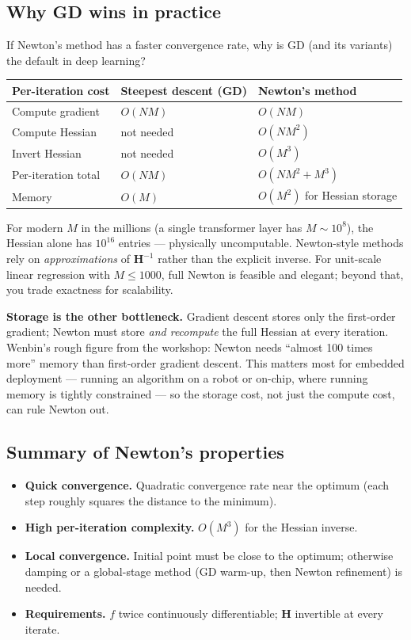 \documentclass[11pt, a4paper]{article}
\newcommand{\thead}[1]{\textbf{#1}}
\begin{document}
\subsection{Why GD wins in practice}

If Newton's method has a faster convergence rate, why is GD (and its variants) the default in deep learning?

\begin{tabularx}{\linewidth}{@{}lXX@{}}
\toprule
\thead{Per-iteration cost}     & \thead{Steepest descent (GD)} & \thead{Newton's method} \\
\midrule
Compute gradient               & $O(NM)$       & $O(NM)$ \\
Compute Hessian                & not needed    & $O(NM^2)$ \\
Invert Hessian                 & not needed    & $O(M^3)$ \\
Per-iteration total            & $O(NM)$       & $O(NM^2 + M^3)$ \\
Memory                         & $O(M)$        & $O(M^2)$ for Hessian storage \\
\bottomrule
\end{tabularx}

For modern $M$ in the millions (a single transformer layer has $M \sim 10^8$), the Hessian alone has $10^{16}$ entries — physically uncomputable. Newton-style methods rely on \emph{approximations} of $\mathbf{H}^{-1}$ rather than the explicit inverse. For unit-scale linear regression with $M\le 1000$, full Newton is feasible and elegant; beyond that, you trade exactness for scalability.

\textbf{Storage is the other bottleneck.} Gradient descent stores only the first-order gradient; Newton must store \emph{and recompute} the full Hessian at every iteration. Wenbin's rough figure from the workshop: Newton needs ``almost 100 times more'' memory than first-order gradient descent. This matters most for embedded deployment — running an algorithm on a robot or on-chip, where running memory is tightly constrained — so the storage cost, not just the compute cost, can rule Newton out.

\subsection{Summary of Newton's properties}

\begin{itemize}
  \item \textbf{Quick convergence.} Quadratic convergence rate near the optimum (each step roughly squares the distance to the minimum).
  \item \textbf{High per-iteration complexity.} $O(M^3)$ for the Hessian inverse.
  \item \textbf{Local convergence.} Initial point must be close to the optimum; otherwise damping or a global-stage method (GD warm-up, then Newton refinement) is needed.
  \item \textbf{Requirements.} $f$ twice continuously differentiable; $\mathbf{H}$ invertible at every iterate.
\end{itemize}
\end{document}
